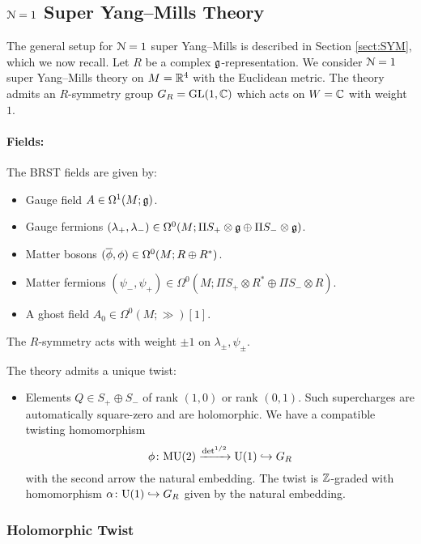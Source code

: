 \documentclass[10pt, oneside]{article}
\begin{document}
\subsection{\texorpdfstring{$\cN=1$}{N=1} Super Yang--Mills Theory} \label{sect:4d_1_section}
The general setup for $\cN=1$ super Yang--Mills is described in Section \ref{sect:SYM}, which we now recall.  Let $R$ be a complex $\fg$-representation. We consider $\cN=1$ super Yang--Mills theory on $M=\RR^4$ with the Euclidean metric. The theory admits an $R$-symmetry group $G_R=\GL(1, \CC)$ which acts on $W=\CC$ with weight $1$.

\vspace{-10pt}
\paragraph{Fields:} The BRST fields are given by:
\begin{itemize}
\item Gauge field $A \in \Omega^1(M; \fg)$.
\item Gauge fermions $(\lambda_+, \lambda_-) \in \Omega^0(M; \Pi S_+ \otimes \fg \oplus \Pi S_- \otimes \fg)$.
\item Matter bosons $(\Bar{\phi}, \phi) \in \Omega^0(M; R \oplus R^*)$.
\item Matter fermions $(\psi_-,\psi_+) \in \Omega^0(M; \Pi S_+ \otimes R^* \oplus \Pi S_- \otimes R)$.
\item A ghost field $A_0\in \Omega^0(M; \gg)[1]$.
\end{itemize}

The $R$-symmetry acts with weight $\pm 1$ on $\lambda_\pm, \psi_\pm$.

The theory admits a unique twist:
\begin{itemize}
\item Elements $Q\in S_+\oplus S_-$ of rank $(1, 0)$ or rank $(0, 1)$. Such supercharges are automatically square-zero and are holomorphic. 
We have a compatible twisting homomorphism 
\[
\phi\colon \MU(2)\xrightarrow{\det^{1/2}}\U(1)\hookrightarrow G_R 
\]
with the second arrow the natural embedding.
The twist is $\ZZ$-graded with homomorphism $\alpha \colon \U(1) \hookrightarrow G_R$ given by the natural embedding.
\end{itemize}

\subsubsection{Holomorphic Twist}
\label{sect:4d1holomorphictwist}
\end{document}
